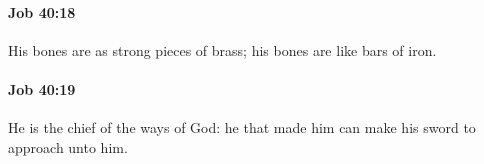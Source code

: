 		\paragraph{Job 40:18} %
			\label{JOB-40-18}

			His bones are as strong pieces of brass; his bones are like bars of iron.


		\paragraph{Job 40:19} %
			\label{JOB-40-19}

			He is the chief of the ways of God: he that made him can make his sword to approach unto him.


